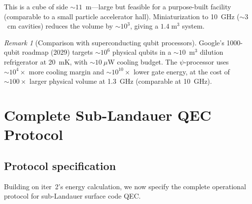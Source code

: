\documentclass[11pt]{article}
\theoremstyle{definition}
\theoremstyle{remark}
\newtheorem{remark}[theorem]{Remark}
\begin{document}
This is a cube of side $\sim 11$~m---large but feasible for a
purpose-built facility (comparable to a small particle accelerator hall).
Miniaturization to 10~GHz ($\sim 3$~cm cavities) reduces the volume by
$\sim 10^3$, giving a $1.4\;\text{m}^3$ system.

\begin{remark}[Comparison with superconducting qubit processors]
Google's 1000-qubit roadmap (2029) targets $\sim 10^6$ physical qubits
in a $\sim 10$~m$^3$ dilution refrigerator at 20~mK, with $\sim 10~\mu$W
cooling budget. The $\psi$-processor uses $\sim 10^4\times$ more cooling
margin and $\sim 10^{10}\times$ lower gate energy, at the cost of
$\sim 100\times$ larger physical volume at 1.3~GHz (comparable at 10~GHz).
\end{remark}


\section{Complete Sub-Landauer QEC Protocol}
\label{sec:qec-protocol}

\subsection{Protocol specification}

Building on iter~2's energy calculation, we now specify the complete
operational protocol for sub-Landauer surface code QEC.
\end{document}
